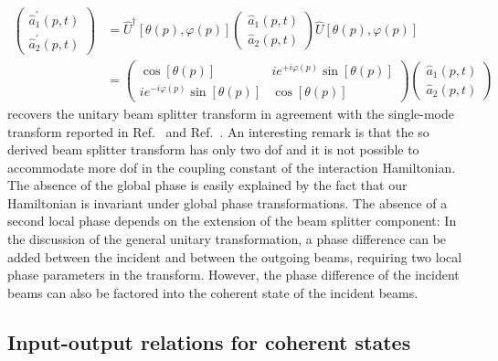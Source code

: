 \begin{equation}
	\begin{split}
		\begin{pmatrix}
			\hat{a}_1^\prime(p,t)
			\\
			\hat{a}_2^\prime(p,t)
		\end{pmatrix}
		&=
		\hat{U}^\dagger\left[\theta(p),\varphi(p)\right]
		\begin{pmatrix}
			\hat{a}_1(p,t)
			\\
			\hat{a}_2(p,t)
		\end{pmatrix}
		\hat{U}\left[\theta(p),\varphi(p)\right]
		\\
		&=
		\begin{pmatrix}
			\cos[\theta(p)] & ie^{+i\varphi(p)}\sin[\theta(p)]
			\\
			ie^{-i\varphi(p)}\sin[\theta(p)] & \cos[\theta(p)]
		\end{pmatrix}
		\begin{pmatrix}
			\hat{a}_1(p,t)
			\\
			\hat{a}_2(p,t)
		\end{pmatrix}
	\end{split}
\end{equation}
recovers the unitary beam splitter transform in agreement with the single-mode transform reported in Ref.~\cite[p.~96]{Leonhardt2003} and Ref.~\cite[p.~130]{Haroche2006}.
An interesting remark is that the so derived beam splitter transform has only two \gls{dof} and it is not possible to accommodate more \gls{dof} in the coupling constant of the interaction Hamiltonian.
The absence of the global phase is easily explained by the fact that our Hamiltonian is invariant under global phase transformations.
The absence of a second local phase depends on the extension of the beam splitter component:
In the discussion of the general unitary transformation, a phase difference can be added between the incident and between the outgoing beams, requiring two local phase parameters in the transform.
However, the phase difference of the incident beams can also be factored into the coherent state of the incident beams.

\FloatBarrier
\subsection{Input-output relations for coherent states}



